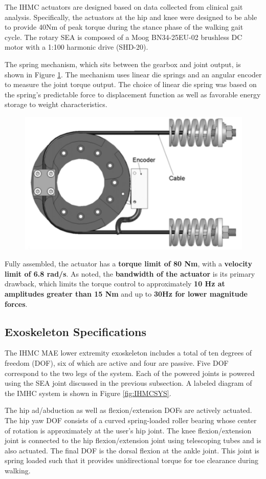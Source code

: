 The IHMC actuators are designed based on data collected from clinical gait analysis.  Specifically, the actuators at the hip and knee were designed to be able to provide 40Nm of peak torque during the stance phase of the walking gait cycle.  The rotary SEA is composed of a Moog BN34-25EU-02 brushless DC motor with a 1:100 harmonic drive (SHD-20).  
 
The spring mechanism, which sits between the gearbox and joint output, is shown in Figure \ref{fig:IHMCSEA}.  The mechanism uses linear die springs and an angular encoder to measure the joint torque output.  The choice of linear die spring was based on the spring's predictable force to displacement function as well as favorable energy storage to weight characteristics.  
\begin{figure}[thpb]
\centering
\includegraphics[width=3.in]{exos/figs/ihmc/seaAssm}
  \caption{}
  \vspace{-0.2in}
 \label{fig:IHMCSEA}   
 \end{figure}
 
Fully assembled, the actuator has a  {\bf torque limit of 80 Nm}, with a {\bf velocity limit of 6.8 rad/s}.  As noted, the {\bf bandwidth of the actuator} is its primary drawback, which limits the torque control to approximately {\bf 10 Hz at amplitudes greater than 15 Nm} and up to {\bf 30Hz for lower magnitude forces}. 
 
 \subsection{Exoskeleton Specifications}
 
 The IHMC MAE lower extremity exoskeleton includes a total of ten degrees of freedom (DOF), six of which are active and four are passive.  Five DOF correspond to the two legs of the system.  Each of the powered joints is powered using the SEA joint discussed in the previous subsection.  A labeled diagram of the IMHC system is shown in Figure \ref{fig:IHMCSYS}.  
 
 The hip ad/abduction as well as flexion/extension DOFs are actively actuated.  The hip yaw DOF consists of a curved spring-loaded roller bearing whose center of rotation is approximately at the user's hip joint. The knee flexion/extension joint is connected to the hip flexion/extension joint using telescoping tubes and is also actuated.  The final DOF is the dorsal flexion at the ankle joint.  This joint is spring loaded such that it provides unidirectional torque for toe clearance during walking.
 
